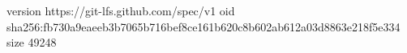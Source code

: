 version https://git-lfs.github.com/spec/v1
oid sha256:fb730a9eaeeb3b7065b716bef8ce161b620c8b602ab612a03d8863e218f5e334
size 49248
